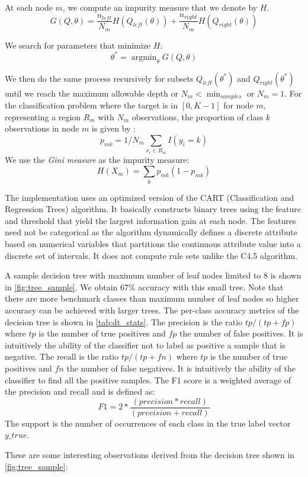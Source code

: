 At each node $m$, we compute an impurity measure that we denote by $H$.
$$G(Q,\theta) = \frac{n_{left}}{N_m} H(Q_{left}(\theta)) +
\frac{n_{right}}{N_m} H(Q_{right}(\theta))$$

We search for parameters that minimize $H$:
$$\theta^* = \operatorname{argmin}_\theta G(Q,\theta)$$

We then do the same process recursively for subsets $Q_{left}(\theta^*)$ and
$Q_{right}(\theta^*)$ until we reach the maximum allowable depth or $N_m
< \min_{samples}$ or $N_m = 1$.
For the classification problem where the target is in $[ 0, K-1]$
for node $m$, representing a region $R_m$ with $N_m$ observations,
the proportion of class $k$ observations in node $m$ is given by :
$$p_{mk} = 1/ N_m \sum_{x_i \in R_m} I(y_i = k)$$
We use the \textit{Gini measure} as the impurity measure:
$$H(X_m) = \sum_k p_{mk} (1 - p_{mk})$$

The implementation uses an optimized version of the CART (Classification and
Regression Trees) algorithm\citep{cart84}.
It basically constructs binary trees using the feature and threshold that
yield the largest information gain at each node.
The features need not be categorical as the algorithm dynamically
defines a discrete attribute based on numerical variables that
partitions the continuous attribute value into a discrete set of intervals.
It does not compute rule sets unlike the C4.5 algorithm\citep{quinlan93}.

A sample decision tree with maximum number of leaf nodes limited to $8$ is shown in
\cref{fig:tree_sample}. We obtain $67\%$ accuracy with this small
tree. Note that there are more benchmark classes than maximum number
of leaf nodes so higher accuracy can be achieved with larger trees.
The per-class accuracy metrics of the decision tree is shown in
\cref{tab:dt_stats}.
The precision is the ratio $tp/(tp+fp)$ where $tp$ is the number of true
positives and $fp$ the number of false positives.
It is intuitively the ability of the classifier not to label
as positive a sample that is negative.
The recall is the ratio $tp/(tp+fn)$ where $tp$ is the number of true
positives and $fn$ the number of false negatives. It is intuitively the
ability of the classifier to find all the positive samples.
The F1 score is a weighted average of the precision and recall
and is defined as:
$$F1 = 2 * \frac{(precision * recall)}{(precision + recall)}$$
The support is the number of occurrences of each class in the true label
vector $y\_true$.

These are some interesting observations derived from the decision tree shown in
\cref{fig:tree_sample}:\\

